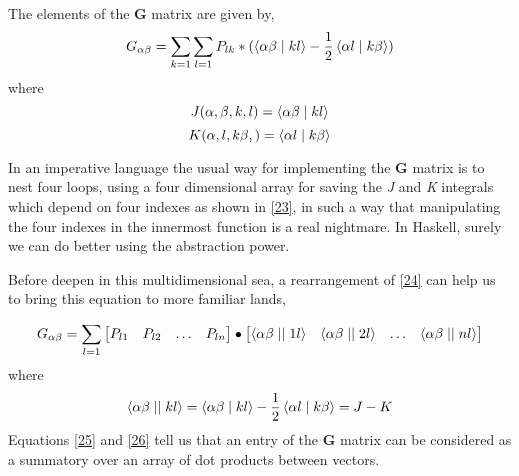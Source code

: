 \documentclass{tmr}
\begin{document}
The elements of the  \textbf{G} matrix are given by,
\begin{equation}\label{24}
 G_{\alpha \beta} = \sum_{k=1}\sum_{l=1} P_{lk} * 
(\braket{\alpha\beta \mid kl} - \frac{1}{2} \braket{\alpha l \mid k \beta })
\end{equation}
where
\[J(\alpha,\beta,k,l) = \braket{\alpha\beta \mid kl} \]
\[K(\alpha,l,k\beta,) = \braket{\alpha l \mid k \beta}\]

In an imperative language the usual way for implementing the \textbf{G} matrix
is to nest four loops, using a four dimensional array for saving the \textit{J} and \textit{K}
integrals which depend on four indexes as shown in \eqref{23}, in such a way that manipulating 
the four indexes in the innermost function is a real nightmare. In Haskell, surely we can do
better using the abstraction power. 
\par Before deepen in this multidimensional sea, a  rearrangement of \eqref{24} can help us
to bring this equation to more familiar lands,

\begin{equation} \label{25}
G_{\alpha \beta} =
\sum_{l=1}
\begin{bmatrix}
 P_{l1} & P_{l2} & \hdots & P_{ln} \\
\end{bmatrix}
\bullet
\begin{bmatrix}
\braket{\alpha \beta \mid \mid 1 l} & \braket{\alpha \beta \mid \mid 2 l} & 
\hdots & \braket{\alpha \beta \mid \mid n l } \\
\end{bmatrix}
\end{equation}
where 
\begin{equation} \label{26}
\braket{\alpha \beta \mid \mid k l} = 
\braket{\alpha \beta \mid k l} - \frac{1}{2} \braket{\alpha l \mid k \beta} = 
J - K 
\end{equation}
Equations \eqref{25} and \eqref{26} tell us that an entry of the 
\textbf{G} matrix can be considered as a summatory over an array of 
dot products between vectors.
\end{document}
